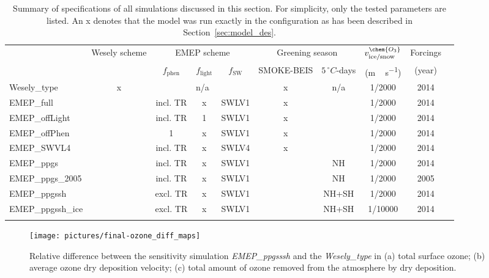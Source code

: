 \documentclass[gmd, manuscript]{copernicus}
\begin{document}
\begin{table*}[t]
  \caption{Summary of specifications of all simulations discussed in this section. For simplicity, only the tested parameters are listed. An x denotes that the model was run exactly in the configuration as has been described in Section~\ref{sec:model_des}.}
  \begin{tabular}{lccccccccc}
    \tophline
    \multirow{2}{*}{Simulation} & Wesely scheme & \multicolumn{3}{c}{EMEP scheme} & \multicolumn{2}{c}{Greening season} & $v^\chem{O_3}_\text{ice/snow}$ & Forcings\\
    & & $f_\text{phen}$ & $f_\text{light}$ & $f_\text{SW}$ & SMOKE-BEIS & $5\,\unit{^\circ C}$-days & (\unit{m\,s^{-1}}) & (year)\\
    \middlehline
    Wesely\_type      & x & \multicolumn{3}{c}{n/a}  & x & n/a   & 1/2000  & 2014 \\
    EMEP\_full        &   & incl. TR & x & SWLV1     & x &       & 1/2000  & 2014 \\
    EMEP\_offLight    &   & incl. TR & 1 & SWLV1     & x &       & 1/2000  & 2014 \\
    EMEP\_offPhen     &   & 1        & x & SWLV1     & x &       & 1/2000  & 2014 \\
    EMEP\_SWVL4       &   & incl. TR & x & SWLV4     & x &       & 1/2000  & 2014 \\
    EMEP\_ppgs        &   & incl. TR & x & SWLV1     &   & NH    & 1/2000  & 2014 \\
    EMEP\_ppgs\_2005  &   & incl. TR & x & SWLV1     &   & NH    & 1/2000  & 2005 \\
    EMEP\_ppgssh      &   & excl. TR & x & SWLV1     &   & NH+SH & 1/2000  & 2014 \\
    EMEP\_ppgssh\_ice &   & excl. TR & x & SWLV1     &   & NH+SH & 1/10000 & 2014 \\
    \bottomhline
  \end{tabular}
  \label{tab:simsum}
\end{table*}
%
\begin{figure}[t]
  \texttt{[image: pictures/final-ozone\_diff\_maps]}
  \caption{Relative difference between the sensitivity simulation \emph{EMEP\_ppgsssh} and the \emph{Wesely\_type} in (a) total surface ozone; (b) average ozone dry deposition velocity; (c) total amount of ozone removed from the atmosphere by dry deposition.}
  \label{fig:diff_maps}
\end{figure}
%
\end{document}
